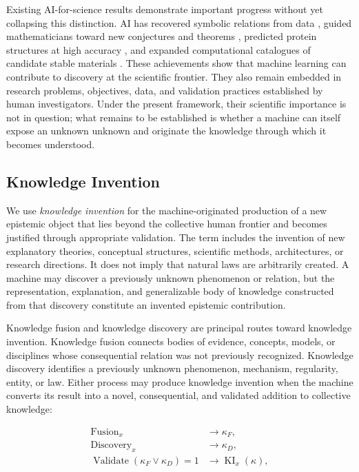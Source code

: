 Existing AI-for-science results demonstrate important progress without yet
collapsing this distinction. AI has recovered symbolic relations from data
\cite{udrescu2020aifeynman}, guided mathematicians toward new conjectures and
theorems \cite{davies2021mathematics}, predicted protein structures at high
accuracy \cite{jumper2021alphafold}, and expanded computational catalogues of
candidate stable materials \cite{merchant2023materials}. These achievements
show that machine learning can contribute to discovery at the scientific
frontier. They also remain embedded in research problems, objectives, data,
and validation practices established by human investigators. Under the present
framework, their scientific importance is not in question; what remains to be
established is whether a machine can itself expose an unknown unknown and
originate the knowledge through which it becomes understood.

\subsection{\textbf{Knowledge Invention}}

We use \emph{knowledge invention} for the machine-originated production of a
new epistemic object that lies beyond the collective human frontier and becomes
justified through appropriate validation. The term includes the invention of
new explanatory theories, conceptual structures, scientific methods,
architectures, or research directions. It does not imply that natural laws are
arbitrarily created. A machine may discover a previously unknown phenomenon or
relation, but the representation, explanation, and generalizable body of
knowledge constructed from that discovery constitute an invented epistemic
contribution.

Knowledge fusion and knowledge discovery are principal routes toward knowledge
invention. Knowledge fusion connects bodies of evidence, concepts, models, or
disciplines whose consequential relation was not previously recognized.
Knowledge discovery identifies a previously unknown phenomenon, mechanism,
regularity, entity, or law. Either process may produce knowledge invention when
the machine converts its result into a novel, consequential, and validated
addition to collective knowledge:

\begin{equation}
\begin{aligned}
\operatorname{Fusion}_{x}
&\longrightarrow \kappa_{F},\\
\operatorname{Discovery}_{x}
&\longrightarrow \kappa_{D},\\
\operatorname{Validate}(\kappa_{F}\lor\kappa_{D})=1
&\longrightarrow \operatorname{KI}_{x}(\kappa),
\end{aligned}
\label{eq:routes_to_invention}
\end{equation}

